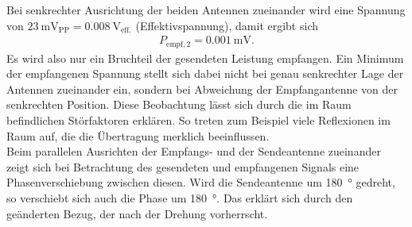\documentclass[a4paper,twoside,final]{article}
\begin{document}
Bei senkrechter Ausrichtung der beiden Antennen zueinander wird eine Spannung von $\SI{23}{\milli\volt_\text{PP}} = \SI{0,008}{\volt_\text{eff.}}$ (Effektivspannung), damit ergibt sich
\begin{align}
P_{\text{empf},2} = \SI{0,001}{\milli\volt}.
\end{align}
Es wird also nur ein Bruchteil der gesendeten Leistung empfangen. Ein Minimum der empfangenen Spannung stellt sich dabei nicht bei genau senkrechter Lage der Antennen zueinander ein, sondern bei Abweichung der Empfangantenne von der senkrechten Position. Diese Beobachtung lässt sich durch die im Raum befindlichen Störfaktoren
erklären. So treten zum Beispiel viele Reflexionen im Raum auf, die die Übertragung merklich beeinflussen. \\
Beim parallelen Ausrichten der Empfangs- und der Sendeantenne zueinander zeigt sich bei Betrachtung des gesendeten und empfangenen Signals eine Phasenverschiebung zwischen diesen. Wird die Sendeantenne um \SI{180}{\degree} gedreht, so verschiebt sich auch die Phase um \SI{180}{\degree}. Das erklärt sich durch den geänderten Bezug, der nach der Drehung vorherrscht.\\
\end{document}
